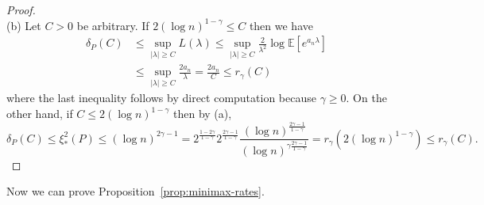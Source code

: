 \documentclass{article}
\theoremstyle{definition}
\newcommand{\E}{\mathbb{E}}
\newcommand{\1}{\mathbbm{1}}
\begin{document}
\begin{proof}
    \\
    (b) Let $C > 0$ be arbitrary. If $2(\log n)^{1 - \gamma} \leq C$ then we have 
    \begin{align*}
        \delta_P(C) &\leq \sup_{|\lambda| \geq C} L(\lambda) \leq \sup_{|\lambda| \geq C} \frac{2}{\lambda^2} \log \E[e^{a_n\lambda}] \\ &\leq \sup_{|\lambda| \geq C}  \frac{2a_n}{\lambda} = \frac{2a_n}{C} \leq r_\gamma(C)
    \end{align*}
    where the last inequality follows by direct computation because $\gamma \geq 0$. 
    On the other hand, if $C \leq 2(\log n)^{1 - \gamma}$ then by (a), 
    \[
    \delta_P(C) \leq \xi_*^2(P) \leq (\log n)^{2\gamma - 1} = 2^{\frac{1 - 2\gamma}{1 - \gamma}}2^{\frac{2\gamma - 1}{1 - \gamma}} \frac{(\log n)^{\frac{2\gamma - 1}{1 - \gamma}}}{(\log n)^{\gamma\frac{2\gamma - 1}{1 - \gamma}}}=r_\gamma(2(\log n)^{1 - \gamma}) \leq r_\gamma(C).
    \]
\end{proof}
Now we can prove Proposition~\ref{prop:minimax-rates}.
\end{document}
